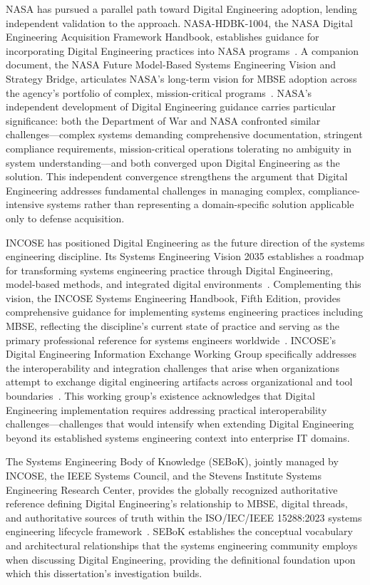 NASA has pursued a parallel path toward Digital Engineering adoption, lending independent validation to the approach. NASA-HDBK-1004, the NASA Digital Engineering Acquisition Framework Handbook, establishes guidance for incorporating Digital Engineering practices into NASA programs~\parencite{NASA_HDBK_1004_2020}. A companion document, the NASA Future Model-Based Systems Engineering Vision and Strategy Bridge, articulates NASA's long-term vision for MBSE adoption across the agency's portfolio of complex, mission-critical programs~\parencite{NASA_MBSE_Vision_2021}. NASA's independent development of Digital Engineering guidance carries particular significance: both the Department of War and NASA confronted similar challenges---complex systems demanding comprehensive documentation, stringent compliance requirements, mission-critical operations tolerating no ambiguity in system understanding---and both converged upon Digital Engineering as the solution. This independent convergence strengthens the argument that Digital Engineering addresses fundamental challenges in managing complex, compliance-intensive systems rather than representing a domain-specific solution applicable only to defense acquisition.

INCOSE has positioned Digital Engineering as the future direction of the systems engineering discipline. Its Systems Engineering Vision 2035 establishes a roadmap for transforming systems engineering practice through Digital Engineering, model-based methods, and integrated digital environments~\parencite{INCOSE_Vision_2035}. Complementing this vision, the INCOSE Systems Engineering Handbook, Fifth Edition, provides comprehensive guidance for implementing systems engineering practices including MBSE, reflecting the discipline's current state of practice and serving as the primary professional reference for systems engineers worldwide~\parencite{INCOSE_Handbook_2023}. INCOSE's Digital Engineering Information Exchange Working Group specifically addresses the interoperability and integration challenges that arise when organizations attempt to exchange digital engineering artifacts across organizational and tool boundaries~\parencite{DigitalEngineeringInformationExchange}. This working group's existence acknowledges that Digital Engineering implementation requires addressing practical interoperability challenges---challenges that would intensify when extending Digital Engineering beyond its established systems engineering context into enterprise IT domains.

The Systems Engineering Body of Knowledge (SEBoK), jointly managed by INCOSE, the IEEE Systems Council, and the Stevens Institute Systems Engineering Research Center, provides the globally recognized authoritative reference defining Digital Engineering's relationship to MBSE, digital threads, and authoritative sources of truth within the ISO/IEC/IEEE 15288:2023 systems engineering lifecycle framework~\parencite{SEBoK_2024}. SEBoK establishes the conceptual vocabulary and architectural relationships that the systems engineering community employs when discussing Digital Engineering, providing the definitional foundation upon which this dissertation's investigation builds.

